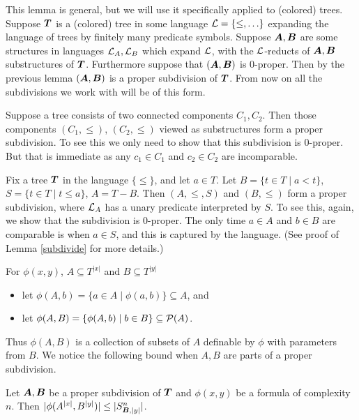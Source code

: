 This lemma is general, but we will use it specifically applied to (colored) trees.
Suppose $\operatorname{\boldsymbol T}$ is a (colored) tree in some language $\mathcal L = \{\leq, \ldots\}$ expanding the language of trees by finitely many predicate symbols.
Suppose $\operatorname{\boldsymbol A}, \operatorname{\boldsymbol B}$ are some structures in languages $\mathcal L_A, \mathcal L_B$ which expand $\mathcal L$, with the $\mathcal L$-reducts of $\operatorname{\boldsymbol A}, \operatorname{\boldsymbol B}$ substructures of $\operatorname{\boldsymbol T}$.
Furthermore suppose that $(\operatorname{\boldsymbol A}, \operatorname{\boldsymbol B})$ is 0-proper.
Then by the previous lemma $(\operatorname{\boldsymbol A}, \operatorname{\boldsymbol B})$ is a proper subdivision of $\operatorname{\boldsymbol T}$.
From now on all the subdivisions we work with will be of this form.

\begin{Example} \label{ex_disc}
  Suppose a tree consists of two connected components $C_1, C_2$.
  Then those components $(C_1, \leq)$, $(C_2, \leq)$ viewed as substructures form a proper subdivision.
  To see this we only need to show that this subdivision is 0-proper.
  But that is immediate as any $c_1 \in C_1$ and $c_2 \in C_2$ are incomparable.
\end{Example}

\begin{Example} \label{ex_cone}
  Fix a tree $\operatorname{\boldsymbol T}$ in the language $\{\leq\}$, and let $a \in T$. Let $B = \{t \in T \mid a < t\}$, $S = \{t \in T \mid t \leq a\}$, $A = T - B$. Then $(A, \leq, S)$ and $(B, \leq)$ form a proper subdivision, where $\mathcal L_A$ has a unary predicate interpreted by $S$.
  To see this, again, we show that the subdivision is 0-proper.
  The only time $a \in A$ and $b \in B$ are comparable is when $a \in S$, and this is captured by the language.
  (See proof of Lemma \ref{subdivide} for more details.)
\end{Example}

\begin{Definition} For $\phi(x, y)$, $A \subseteq T^{|x|}$ and $B \subseteq T^{|y|}$
  \begin{itemize}
  \item let $\phi(A, b) = \{a \in A \mid \phi(a, b)\} \subseteq A$, and 
  \item let $\phi(A, B) = \{\phi(A, b) \mid b \in B\} \subseteq \mathcal P(A)$.	
  \end{itemize}
\end{Definition}
Thus $\phi(A, B)$ is a collection of subsets of $A$ definable by $\phi$ with parameters from $B$. We notice the following bound when $A, B$ are parts of a proper subdivision.

\begin{Corollary} \label{cor_type_count}
  Let $\operatorname{\boldsymbol A}, \operatorname{\boldsymbol B}$ be a proper subdivision of $\operatorname{\boldsymbol T}$ and $\phi(x,y)$ be a formula of complexity $n$. Then $|\phi(A^{|x|}, B^{|y|})| \leq |S^n_{\operatorname{\boldsymbol B}, |y|}|$.
\end{Corollary}

